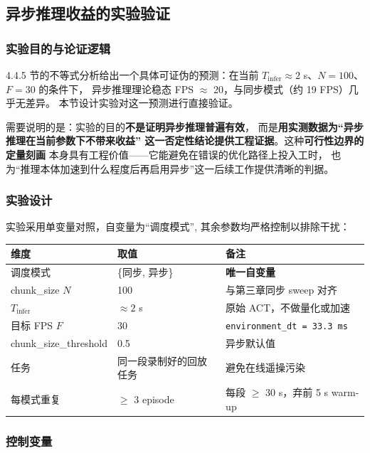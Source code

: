 \subsection{异步推理收益的实验验证}\label{sec:async-exp}

\subsubsection{实验目的与论证逻辑}\label{sec:async-exp-purpose}

4.4.5 节的不等式分析给出一个具体可证伪的预测：在当前
$T_{\text{infer}} \approx 2$ s、$N = 100$、$F = 30$ 的条件下，
异步推理理论稳态 FPS $\approx$ 20，与同步模式（约 19 FPS）几乎无差异。
本节设计实验对这一预测进行直接验证。

需要说明的是：实验的目的\textbf{不是证明异步推理普遍有效}，
而是\textbf{用实测数据为``异步推理在当前参数下不带来收益''
这一否定性结论提供工程证据}。这种\textbf{可行性边界的定量刻画}
本身具有工程价值——它能避免在错误的优化路径上投入工时，
也为``推理本体加速到什么程度后再启用异步''这一后续工作提供清晰的判据。

\subsubsection{实验设计}\label{sec:async-exp-design}

实验采用单变量对照，自变量为``调度模式'',
其余参数均严格控制以排除干扰：

\begin{center}
\begin{tabular}{lll}
  \toprule
  维度 & 取值 & 备注 \\
  \midrule
  调度模式 & \{同步, 异步\} & \textbf{唯一自变量} \\
  chunk\_size $N$ & 100 & 与第三章同步 sweep 对齐 \\
  $T_{\text{infer}}$ & $\approx 2$ s & 原始 ACT，不做量化或加速 \\
  目标 FPS $F$ & 30 & \texttt{environment\_dt = 33.3 ms} \\
  chunk\_size\_threshold & 0.5 & 异步默认值 \\
  任务 & 同一段录制好的回放任务 & 避免在线遥操污染 \\
  每模式重复 & $\geq$ 3 episode & 每段 $\geq$ 30 s，弃前 5 s warm-up \\
  \bottomrule
\end{tabular}
\end{center}

\subsubsection{控制变量}\label{sec:async-exp-control}

